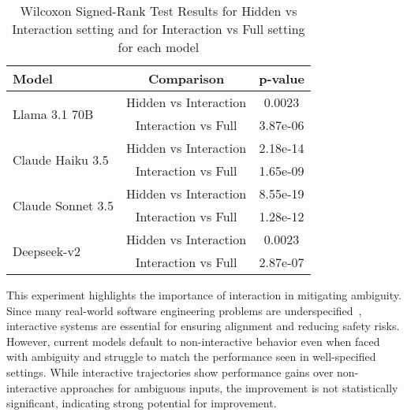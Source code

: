 \begin{table}[h]
    \centering
    \begin{tabular}{lcc}
        \toprule
        \textbf{Model} & \textbf{Comparison} & \textbf{p-value} \\
        \midrule
        \multirow{2}{*}{Llama 3.1 70B} & Hidden vs Interaction & 0.0023 \\
                                       & Interaction vs Full & 3.87e-06 \\
        \midrule
        \multirow{2}{*}{Claude Haiku 3.5} & Hidden vs Interaction & 2.18e-14  \\
                                          & Interaction vs Full & 1.65e-09  \\
        \midrule
        \multirow{2}{*}{Claude Sonnet 3.5} & Hidden vs Interaction & 8.55e-19  \\
                                           & Interaction vs Full & 1.28e-12 \\
        \midrule
        \multirow{2}{*}{Deepseek-v2} & Hidden vs Interaction & 0.0023  \\
                                       & Interaction vs Full & 2.87e-07 \\
        \bottomrule
    \end{tabular}
    \caption{Wilcoxon Signed-Rank Test Results for Hidden vs Interaction setting and for Interaction vs Full setting for each model}
    \label{tab:wilcoxon_results}
\end{table}
This experiment highlights the importance of interaction in mitigating ambiguity. Since many real-world software engineering problems are underspecified~\cite{SWE_Bench_Verified}, interactive systems are essential for ensuring alignment and reducing safety risks. However, current models default to non-interactive behavior even when faced with ambiguity and struggle to match the performance seen in well-specified settings. While interactive trajectories show performance gains over non-interactive approaches for ambiguous inputs, the improvement is not statistically significant, indicating strong potential for improvement.

